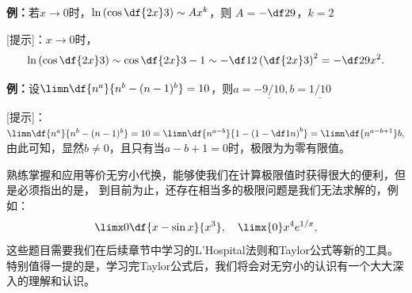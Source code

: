 {\bf 例：}若$x\to 0$时，$\ln\left(\cos\df{2x}3\right)\sim Ax^k$，则
$A=$\underline{$-\df29$}，$k=$\underline{$2$}

[提示]：$x\to 0$时，
$$\ln\left(\cos\df{2x}3\right)\sim \cos\df{2x}3-1
\sim-\df12\left(\df{2x}3\right)^2=-\df29x^2.$$

{\bf 例：}设$\limn\df{n^a}{n^b-(n-1)^b}=10$，则$a=\underline{-9/10},
b=\underline{1/10}$

[提示]：
$\limn\df{n^a}{n^b-(n-1)^b}=10=\limn\df{n^{a-b}}{1-\left(1-\df1n\right)^b}
=\limn\df{n^{a-b+1}}b,$
由此可知，显然$b\ne 0$，且只有当$a-b+1=0$时，极限为为零有限值。

熟练掌握和应用等价无穷小代换，能够使我们在计算极限值时获得很大的便利，但是必须指出的是，
到目前为止，还存在相当多的极限问题是我们无法求解的，例如：
$$\limx0\df{x-\sin x}{x^3},
\quad\limx{0}x^4{e^{1/x}},$$
这些题目需要我们在后续章节中学习的L'Hospital法则和Taylor公式等新的工具。
特别值得一提的是，学习完Taylor公式后，我们将会对无穷小的认识有一个大大深入的理解和认识。

